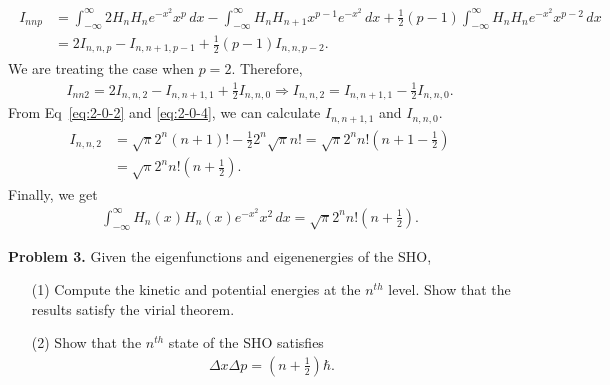\documentclass[floatfix,nofootinbib,superscriptaddress,fleqn]{revtex4-2}
\begin{document}
\begin{itemize}
\begin{align}
  \begin{split}
    I_{nnp} &= \int^{\infty}_{-\infty}
    2H_n H_n e^{-x^2}x^{p}\,dx
    - \int^{\infty}_{-\infty}
    H_nH_{n+1}x^{p-1}e^{-x^2}\,dx
    +\frac{1}{2}(p-1)\int^{\infty}_{-\infty}
    H_n H_n e^{-x^2}x^{p-2}\,dx \\
    &= 2I_{n,n,p}-I_{n,n+1,p-1}+\frac{1}{2}(p-1)I_{n,n,p-2}.
  \end{split}
\end{align}
We are treating the case when $p=2$. Therefore,
\begin{align}
  I_{nn2} = 2I_{n,n,2}-I_{n,n+1,1}+\frac{1}{2}I_{n,n,0}
  \Longrightarrow
  I_{n,n,2}=I_{n,n+1,1}-\frac{1}{2}I_{n,n,0}.
\end{align}
From Eq~\eqref{eq:2-0-2} and \eqref{eq:2-0-4}, we can calculate
$I_{n,n+1,1}$ and $I_{n,n,0}$.
\begin{align}
  \begin{split}
    I_{n,n,2} &= \sqrt{\pi}2^n(n+1)!-\frac{1}{2}2^n\sqrt{\pi}n!
    =\sqrt{\pi}2^n n! \left(n+1-\frac{1}{2}\right)  \\
    &=\sqrt{\pi}2^n n!\left(n+\frac{1}{2}\right).
  \end{split}
\end{align}
Finally, we get
\begin{align}
  \int^{\infty}_{-\infty}H_n(x)H_n(x)e^{-x^2}x^2\,dx
  =\sqrt{\pi}2^n n!\left(n+\frac{1}{2}\right).
\end{align}
\end{itemize}

\vspace{0.5cm}

\noindent \textbf{Problem 3.} 
Given the eigenfunctions and eigenenergies of the SHO, 
\begin{itemize}
\item[(1)] Compute the kinetic and potential energies at the $n^{th}$
  level.  Show that the results satisfy the virial theorem. 
\item[(2)] Show that the $n^{th}$ state of the SHO satisfies 
  \begin{align}
    \Delta x \Delta p = \left(n+\frac12\right)\hbar.
  \end{align}
\end{itemize}
\end{document}

